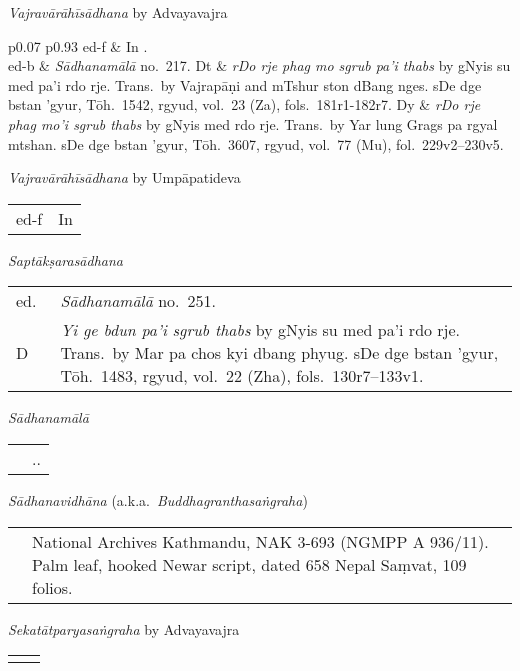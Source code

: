 \documentclass[12pt,twoside]{article}
\newcommand{\mybibexclude}[1]{\addtocategory{fullcited}{#1}}
\begin{document}
\noindent\emph{Vajravārāhīsādhana} by Advayavajra
\noindent\begin{longtable}{ p{} p{} }
	ed-f & In .\mybibexclude{finot1934} \\ 
	ed-b & \emph{Sādhanamālā} no.\ 217.
	Dt & \emph{rDo rje phag mo sgrub pa'i thabs} by gNyis su med pa'i rdo rje. Trans.\ by Vajrapāṇi and mTshur ston dBang nges. sDe dge bstan 'gyur, Tōh.\ 1542, rgyud, vol.\ 23 (Za), fols.\ 181r1-182r7.
	Dy & \emph{rDo rje phag mo'i sgrub thabs} by gNyis med rdo rje. Trans.\ by Yar lung Grags pa rgyal mtshan. sDe dge bstan 'gyur, Tōh.\ 3607, rgyud, vol.\ 77 (Mu), fol.\ 229v2–230v5.
\end{longtable}

\noindent\emph{Vajravārāhīsādhana} by Umpāpatideva
\noindent\begin{longtable}{ p{} p{} }
	ed-f & In \fullcite*{english2002} \\ 
\end{longtable}

\noindent\emph{Saptākṣarasādhana} 
\noindent\begin{longtable}{ p{} p{} }
	ed.\ & \emph{Sādhanamālā} no.\ 251. \\
	D & \emph{Yi ge bdun pa'i sgrub thabs} by gNyis su med pa'i rdo rje. Trans.\ by Mar pa chos kyi dbang phyug. sDe dge bstan 'gyur, Tōh.\ 1483, rgyud, vol.\ 22 (Zha), fols.\ 130r7–133v1. 
\end{longtable}

\noindent\emph{Sādhanamālā} 
\noindent\begin{longtable}{ p{} p{} }
	& \fullcite*{bhattacharyya1925}.\mybibexclude{bhattacharyya1925}.
\end{longtable}

\noindent\emph{Sādhanavidhāna} (a.k.a.\ \emph{Buddhagranthasaṅgraha}) 
\noindent\begin{longtable}{ p{} p{} }
	& National Archives Kathmandu, NAK 3-693 (NGMPP A 936/11). Palm leaf, hooked Newar script, dated 658 Nepal Saṃvat, 109 folios. 
\end{longtable}

\noindent\emph{Sekatātparyasaṅgraha} by Advayavajra
\noindent\begin{longtable}{ p{} p{} }
	& \cite[403–414]{mathes2015} 
\end{longtable}
\end{document}
